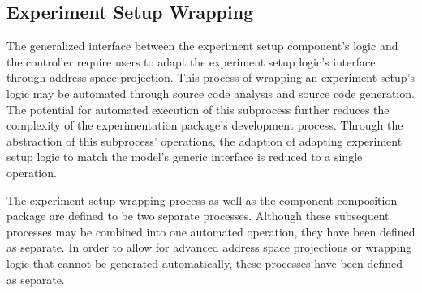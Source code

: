 \documentclass[main.tex]{subfiles}
\begin{document}
\subsection{Experiment Setup Wrapping}
\label{sectionexperimentsetupwrapping}
The generalized interface between the experiment setup component's logic and the controller require users to adapt the experiment setup logic's interface through address space projection. This process of wrapping an experiment setup's logic may be automated through source code analysis and source code generation. The potential for automated execution of this subprocess further reduces the complexity of the experimentation package's development process. Through the abstraction of this subprocess' operations, the adaption of adapting experiment setup logic to match the model's generic interface is reduced to a single operation.

The experiment setup wrapping process as well as the component composition package are defined to be two separate processes. Although these subsequent processes may be combined into one automated operation, they have been defined as separate. In order to allow for advanced address space projections or wrapping logic that cannot be generated automatically, these processes have been defined as separate. 




\end{document}
